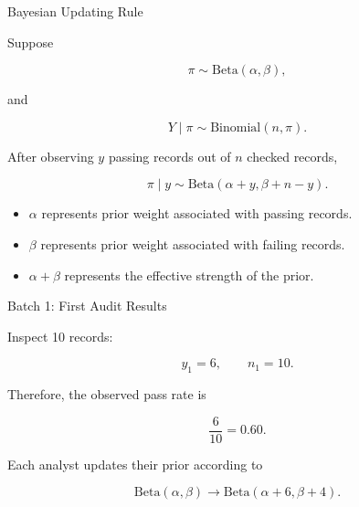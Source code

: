 \documentclass[aspectratio=43]{beamer}
\begin{document}
\begin{frame}{Bayesian Updating Rule}

Suppose

\[
\pi \sim \mathrm{Beta}(\alpha,\beta),
\]

and

\[
Y \mid \pi \sim \mathrm{Binomial}(n,\pi).
\]

After observing $y$ passing records out of $n$ checked records,

\[
\pi \mid y
\sim
\mathrm{Beta}(\alpha+y,\beta+n-y).
\]

\vspace{0.3cm}

\begin{itemize}
  \item $\alpha$ represents prior weight associated with passing records.
  \item $\beta$ represents prior weight associated with failing records.
  \item $\alpha+\beta$ represents the effective strength of the prior.
\end{itemize}

\end{frame}

\begin{frame}{Batch 1: First Audit Results}

Inspect 10 records:

\[
y_1 = 6,
\qquad
n_1 = 10.
\]

Therefore, the observed pass rate is

\[
\frac{6}{10}=0.60.
\]

\vspace{0.4cm}

Each analyst updates their prior according to

\[
\mathrm{Beta}(\alpha,\beta)
\longrightarrow
\mathrm{Beta}(\alpha+6,\beta+4).
\]

\end{frame}
\end{document}
